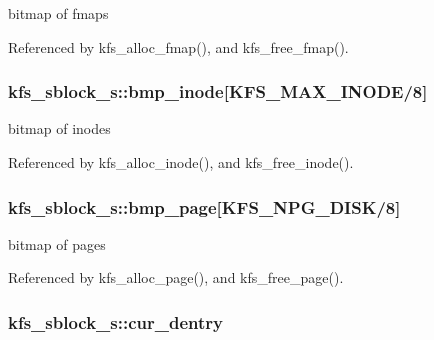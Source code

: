 bitmap of fmaps 



Referenced by kfs\-\_\-alloc\-\_\-fmap(), and kfs\-\_\-free\-\_\-fmap().

\hypertarget{structkfs__sblock__s_a4320a5d34fc85b90d0422ae8ff024d7f}{
\subsubsection[{bmp\-\_\-inode}]{ kfs\-\_\-sblock\-\_\-s\-::bmp\-\_\-inode\mbox{[}{\bf K\-F\-S\-\_\-\-M\-A\-X\-\_\-\-I\-N\-O\-D\-E}/8\mbox{]}}}\label{structkfs__sblock__s_a4320a5d34fc85b90d0422ae8ff024d7f}


bitmap of inodes 



Referenced by kfs\-\_\-alloc\-\_\-inode(), and kfs\-\_\-free\-\_\-inode().

\hypertarget{structkfs__sblock__s_a163e19c03f2551155f6b94c304103da3}{
\subsubsection[{bmp\-\_\-page}]{ kfs\-\_\-sblock\-\_\-s\-::bmp\-\_\-page\mbox{[}{\bf K\-F\-S\-\_\-\-N\-P\-G\-\_\-\-D\-I\-S\-K}/8\mbox{]}}}\label{structkfs__sblock__s_a163e19c03f2551155f6b94c304103da3}


bitmap of pages 



Referenced by kfs\-\_\-alloc\-\_\-page(), and kfs\-\_\-free\-\_\-page().

\hypertarget{structkfs__sblock__s_ab9a8e05095ae32b5274f22f0c937b0bd}{
\subsubsection[{cur\-\_\-dentry}]{ kfs\-\_\-sblock\-\_\-s\-::cur\-\_\-dentry}}\label{structkfs__sblock__s_ab9a8e05095ae32b5274f22f0c937b0bd}


